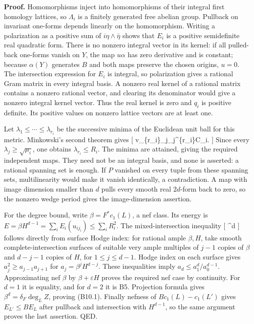 \documentclass[11pt,a4paper]{article}
\theoremstyle{definition}
\begin{document}
\textbf{Proof.} Homomorphisms inject into homomorphisms of their
integral first homology lattices, so \(\Lambda_i\) is a finitely
generated free abelian group. Pullback on invariant one-forms depends
linearly on the homomorphism. Writing a polarization as a positive sum
of \(i\eta\wedge\bar\eta\) shows that \(E_i\) is a positive semidefinite
real quadratic form. There is no nonzero integral vector in its kernel:
if all pulled-back one-forms vanish on \(Y\), the map \(u\alpha\) has
zero derivative and is constant; because \(\alpha(Y)\) generates \(B\)
and both maps preserve the chosen origins, \(u=0\). The intersection
expression for \(E_i\) is integral, so polarization gives a rational
Gram matrix in every integral basis. A nonzero real kernel of a rational
matrix contains a nonzero rational vector, and clearing its denominator
would give a nonzero integral kernel vector. Thus the real kernel is
zero and \(q_i\) is positive definite. Its positive values on nonzero
lattice vectors are at least one.

Let \(\lambda_1\le\cdots\le\lambda_{r_i}\) be the successive minima of
the Euclidean unit ball for this metric. Minkowski's second theorem
gives {[} v\_\{r\_i\}\prod\_j\lambda\_j\^{}\{r\_i\}C\_i. {]} Since
every \(\lambda_j\ge\sqrt{\mu_i}\), one obtains
\(\lambda_{r_i}\le R_i\). The minima are attained, giving the required
independent maps. They need not be an integral basis, and none is
asserted: a rational spanning set is enough. If \(P\) vanished on every
tuple from these spanning sets, multilinearity would make it vanish
identically, a contradiction. A map with image dimension smaller than
\(d\) pulls every smooth real \(2d\)-form back to zero, so the nonzero
wedge period gives the image-dimension assertion.

For the degree bound, write \(\beta=F^*c_1(L)\), a nef class. Its energy
is \(E=\beta H^{d-1}=\sum_iE_i(u_{ij_i})\le\sum_iR_i^2\). The
mixed-intersection inequality {[}
\beta\^{}d\le{}  {]}
follows directly from surface Hodge index: for rational ample
\(\beta,H\), take smooth complete-intersection surfaces of suitable very
ample multiples of \(j-1\) copies of \(\beta\) and \(d-j-1\) copies of
\(H\), for \(1\le j\le d-1\). Hodge index on each surface gives
\(a_j^2\ge a_{j-1}a_{j+1}\) for \(a_j=\beta^jH^{d-j}\). These
inequalities imply \(a_d\le a_1^d/a_0^{d-1}\). Approximating nef
\(\beta\) by \(\beta+\varepsilon H\) proves the required nef case by
continuity. For \(d=1\) it is equality, and for \(d=2\) it is B5.
Projection formula gives \(\beta^d=\delta_F\deg_L Z\), proving (B10.1).
Finally nefness of \(Bc_1(L)-c_1(L')\) gives \(E_{L'}\le B E_L\) after
pullback and intersection with \(H^{d-1}\), so the same argument proves
the last assertion. QED.
\end{document}
